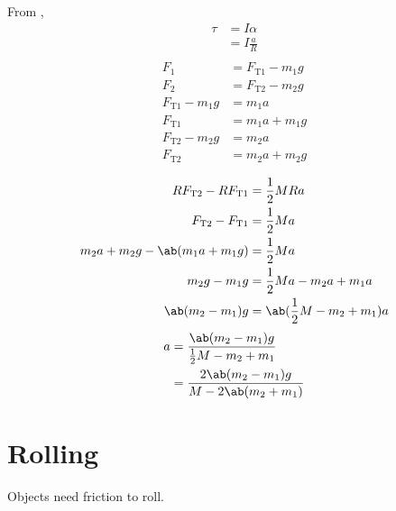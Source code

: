 From ,
\begin{equation*}
    \begin{aligned}
        \tau &= I \alpha \\
        &= I \frac{a}{R} \\
    \end{aligned}
\end{equation*}
\begin{equation}
    \begin{aligned}
        F_1 &= F_\mathrm{T1} - m_1 g \\
        F_2 &= F_\mathrm{T2} - m_2 g \\
        F_\mathrm{T1} - m_1 g &= m_1 a \\
        F_\mathrm{T1} &= m_1 a + m_1 g \\
        F_\mathrm{T2} - m_2 g &= m_2 a \\
        F_\mathrm{T2} &= m_2 a + m_2 g \\
    \end{aligned}
\end{equation}
\begin{equation}
    \begin{aligned}
        R F_\mathrm{T2} - R F_\mathrm{T1} &= \frac{1}{2} M R a \\
        F_\mathrm{T2} - F_\mathrm{T1} &= \frac{1}{2} M a \\
        m_2 a + m_2 g - \ab( m_1 a + m_1 g ) &= \frac{1}{2} M a \\
        m_2 g - m_1 g &= \frac{1}{2} M a - m_2 a + m_1 a \\
        \ab( m_2 - m_1 ) g &= \ab( \frac{1}{2} M - m_2 + m_1 ) a \\
    \end{aligned}
\end{equation}
\begin{equation}
    \begin{aligned}
        a &= \frac{\ab( m_2 - m_1 ) g}{\frac{1}{2} M - m_2 + m_1} \\
        &= \frac{2 \ab( m_2 - m_1 ) g}{M - 2 \ab( m_2 + m_1 )}
    \end{aligned}
\end{equation}

\section{Rolling}

Objects need friction to roll.

